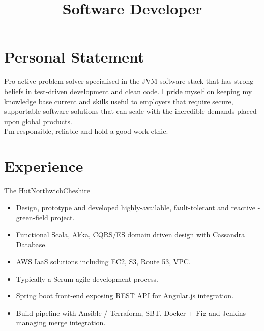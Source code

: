 \documentclass[a4paper,10pt]{moderncv}
\title{Software Developer}
\newcommand\weblink[2] {{\color{href} \href{#1}{#2}}}
\begin{document}
\maketitle

\section{Personal Statement}
Pro-active problem solver specialised in the JVM software stack that has strong beliefs in test-driven development and clean code.
I pride myself on keeping my knowledge base current and skills useful to employers that require secure, supportable software solutions that can scale with the incredible demands placed upon global products.\\

I'm responsible, reliable and hold a good work ethic.

\section{Experience}

{\weblink{http://www.thehutgroup.com}{The Hut}}{Northwich}{Cheshire}{
\begin{itemize}
  \item Design, prototype and developed highly-available, fault-tolerant and reactive - green-field project.
  \item Functional Scala, Akka, CQRS/ES domain driven design with Cassandra Database.
  \item AWS IaaS solutions including EC2, S3, Route 53, VPC.
  \item Typically a Scrum agile development process.
  \item Spring boot front-end exposing REST API for Angular.js integration.
  \item Build pipeline with Ansible / Terraform, SBT, Docker + Fig and Jenkins managing merge integration.
\end{itemize}
}
\end{document}
